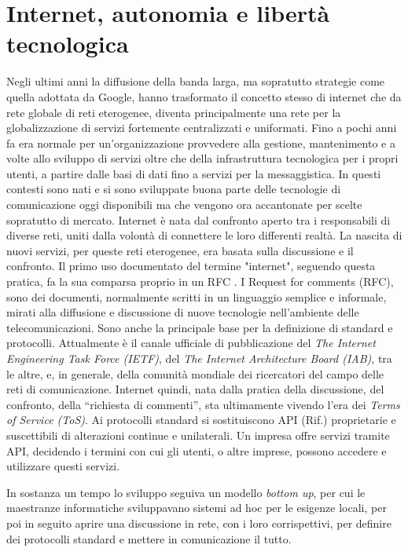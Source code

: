 \section{Internet, autonomia e libertà tecnologica}
Negli ultimi anni la diffusione della banda larga, ma sopratutto
strategie come quella adottata da Google, hanno trasformato il
concetto stesso di internet che da rete globale di reti eterogenee,
diventa principalmente una rete per la globalizzazione di servizi
fortemente centralizzati e uniformati. Fino a pochi anni fa era
normale per un'organizzazione provvedere alla gestione, mantenimento e
a volte allo sviluppo di servizi oltre che della infrastruttura
tecnologica per i propri utenti, a partire dalle basi di dati fino a
servizi per la messaggistica. In questi contesti sono nati e si sono
sviluppate buona parte delle tecnologie di comunicazione oggi
disponibili ma che vengono ora accantonate per scelte sopratutto di
mercato. Internet è nata dal confronto aperto tra i responsabili di
diverse reti, uniti dalla volontà di connettere le loro differenti
realtà. La nascita di nuovi servizi, per queste reti eterogenee, era
basata sulla discussione e il confronto. Il primo uso documentato del
termine "internet", seguendo questa pratica, fa la sua comparsa
proprio in un RFC \citep{RFC675}. I Request for comments (RFC), sono
dei documenti, normalmente scritti in un linguaggio semplice e
informale, mirati alla diffusione e discussione di nuove tecnologie
nell'ambiente delle telecomunicazioni. Sono anche la principale base
per la definizione di standard e protocolli. Attualmente è il canale
ufficiale di pubblicazione del \emph{The Internet Engineering Task
  Force (IETF)}, del \emph{The Internet Architecture Board (IAB)}, tra
le altre, e, in generale, della comunità mondiale dei ricercatori del
campo delle reti di comunicazione. Internet quindi, nata dalla pratica
della discussione, del confronto, della ``richiesta di commenti'', sta
ultimamente vivendo l'era dei \emph{Terms of Service (ToS)}. Ai
protocolli standard si sostituiscono API (Rif.) proprietarie e
suscettibili di alterazioni continue e unilaterali. Un impresa offre
servizi tramite API, decidendo i termini con cui gli utenti, o altre
imprese, possono accedere e utilizzare questi servizi.

In sostanza un tempo lo sviluppo seguiva un modello \emph{bottom up}, per
cui le maestranze informatiche sviluppavano sistemi ad hoc per le
esigenze locali, per poi in seguito aprire una discussione in rete,
con i loro corrispettivi, per definire dei protocolli standard e
mettere in comunicazione il tutto.


